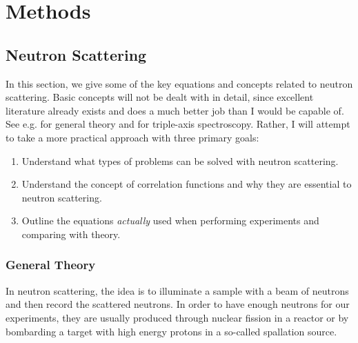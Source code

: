 \newcommand{\jp}{j^\prime}
\newcommand{\jpp}{j^{\prime\prime}}
\newcommand{\lp}{l^\prime}
\newcommand{\lpp}{l^{\prime\prime}}
\newcommand{\fc}{\bm{\Phi}\genfrac{(}{)}{0pt}{}{j \jp}{l \lp}}
\newcommand{\fczero}{\bm{\Phi}\genfrac{(}{)}{0pt}{}{j \jp}{0 \lp}}
\newcommand{\fcb}{\bm{\Theta}\genfrac{(}{)}{0pt}{}{j \jp}{l \lp}}
\newcommand{\fcbpp}{\bm{\Theta}\genfrac{(}{)}{0pt}{}{j \jpp}{l \lpp}}
\newcommand{\fcbf}{-\bm{\Theta}\genfrac{(}{)}{0pt}{}{j \jp}{l \lp} + \delta_{j,\jp} \delta_{l,\lp} \sum_{\jpp, \lpp}  \bm{\Theta}\genfrac{(}{)}{0pt}{}{j \jpp}{l \lpp} }
\newcommand{\rla}[1]{\langle #1 \rangle}
\newcommand*\tageq{\refstepcounter{equation}\tag{\theequation}}

\chapter{Methods}\label{ch:method}

\section{Neutron Scattering}\label{sec:neutron}
In this section, we give some of the key equations and concepts related to neutron scattering. Basic concepts will not be dealt with in detail, since excellent literature already exists and does a much better job than I would be capable of. See e.g. \cite{Lovesey1984, Squires2012, Schober2014} for general theory and \cite{Shirane2002} for triple-axis spectroscopy. Rather, I will attempt to take a more practical approach with three primary goals:

\begin{enumerate}
	\item Understand what types of problems can be solved with neutron scattering.
	\item Understand the concept of correlation functions and why they are essential to neutron scattering.
	\item Outline the equations \emph{actually} used when performing experiments and comparing with theory.
\end{enumerate}

\subsection{General Theory}
In neutron scattering, the idea is to illuminate a sample with a beam of neutrons and then record the scattered neutrons. In order to have enough neutrons for our experiments, they are usually produced through nuclear fission in a reactor or by bombarding a target with high energy protons in a so-called spallation source.

